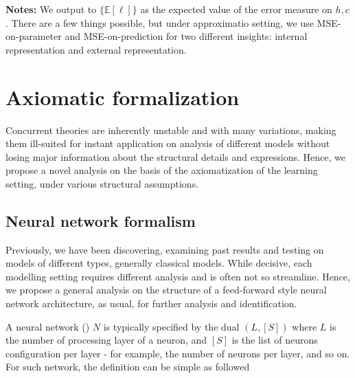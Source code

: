 \documentclass[10pt]{article} %
\begin{document}
\begin{table}[htb]
\begin{threeparttable}
    \begin{tablenotes}
      \footnotesize
      \item[] \textbf{Notes:} We output to $\{\mathbb{E}[\ell]\}$ as the expected value of the error measure on $h,c$. There are a few things possible, but under approximatio setting, we use MSE-on-parameter and MSE-on-prediction for two different insights: internal representation and external representation. 
    \end{tablenotes}
  \end{threeparttable}
\end{table}

\clearpage

\section{Axiomatic formalization}

Concurrent theories are inherently unstable and with many variations, making them ill-suited for instant application on analysis of different models without losing major information about the structural details and expressions. Hence, we propose a novel analysis on the basis of the axiomatization of the learning setting, under various structural assumptions. 

\subsection{Neural network formalism}
Previously, we have been discovering, examining past results and testing on models of different types, generally classical models. While decisive, each modelling setting requires different analysis and is often not so streamline. Hence, we propose a general analysis on the structure of a feed-forward style neural network architecture, as usual, for further analysis and identification. 

A neural network (\cite{goodfellow2016deep,zhang2023mathematical}) $N$ is typically specified by the dual $(L,[S])$ where $L$ is the number of processing layer of a neuron, and $[S]$ is the list of neurons configuration per layer - for example, the number of neurons per layer, and so on. For such network, the definition can be simple as followed 
\end{document}
